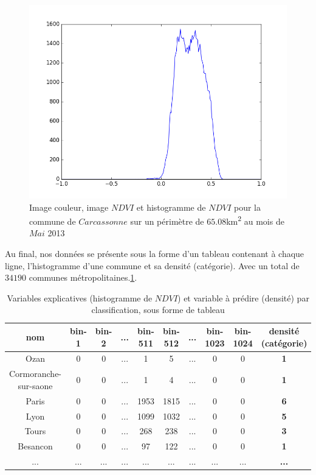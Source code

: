 \documentclass{book}
\begin{document}
\begin{figure}[H]
{}
\begin{center}
\includegraphics[scale=0.45]{images/05_ndvi_histo.png}
\end{center}
\caption{Image couleur, image $NDVI$ et histogramme de $NDVI$ pour la commune de $Carcassonne$ sur un périmètre de $65.08$km\textsuperscript{2} au mois de $Mai$ 2013}
\label{ndvi_extraction}
\end{figure}

Au final, nos données se présente sous la forme d'un tableau contenant à chaque ligne, l'histogramme d'une commune et sa densité (catégorie). Avec un total
de $34190$ communes métropolitaines.\ref{data_class}.

\begin{table}[H]
\begin{center}
\begin{adjustbox}{max width=\textwidth}
\begin{tabular}{|c|c|c|c|c|c|c|c|c|>{\bfseries}c|}
\hline 
nom &  bin-1 & bin-2 & ... & bin-511 & bin-512 &... & bin-1023 & bin-1024 & densité (catégorie) \\
\hline 
Ozan & 0 & 0 & ... & 1 & 5 & ... & 0 & 0 & 1\\
\hline 
Cormoranche-sur-saone & 0 & 0 & ... & 1 & 4 & ... & 0 & 0 & 1\\
\hline 
Paris & 0 & 0 & ... & 1953 & 1815 & ... & 0 & 0 & 6\\
\hline
Lyon & 0 & 0 & ... & 1099 & 1032 & ... & 0 & 0 & 5\\
\hline
Tours & 0 & 0 & ... & 268 & 238 & ... & 0 & 0 & 3\\
\hline
Besancon & 0 & 0 & ... & 97 & 122 & ... & 0 & 0 & 1\\
\hline 
... & ... & ... & ... & ... & ... & ... & ... & ... & ... \\
\hline
\end{tabular}
\end{adjustbox}
\end{center}
\caption{Variables explicatives (histogramme de $NDVI$) et variable à prédire (densité) par classification, sous forme de tableau}
\label{data_class}
\end{table}
\end{document}
